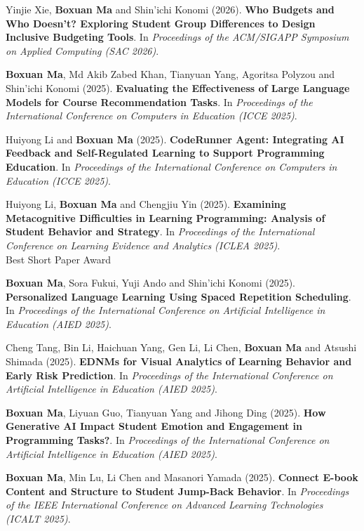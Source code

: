 \documentclass[a4paper,11pt]{article}
\begin{document}
\item[\textbf{[C.31]}] Yinjie Xie, \textbf{Boxuan Ma} and Shin'ichi Konomi (2026). \textbf{Who Budgets and Who Doesn't? Exploring Student Group Differences to Design Inclusive Budgeting Tools}. In \textit{Proceedings of the ACM/SIGAPP Symposium on Applied Computing (SAC 2026)}.
\item[\textbf{[C.30]}] \textbf{Boxuan Ma}, Md Akib Zabed Khan, Tianyuan Yang, Agoritsa Polyzou and Shin'ichi Konomi (2025). \textbf{Evaluating the Effectiveness of Large Language Models for Course Recommendation Tasks}. In \textit{Proceedings of the International Conference on Computers in Education (ICCE 2025)}.
\item[\textbf{[C.29]}] Huiyong Li and \textbf{Boxuan Ma} (2025). \textbf{CodeRunner Agent: Integrating AI Feedback and Self-Regulated Learning to Support Programming Education}. In \textit{Proceedings of the International Conference on Computers in Education (ICCE 2025)}.
\item[\textbf{[C.28]}] Huiyong Li, \textbf{Boxuan Ma} and Chengjiu Yin (2025). \textbf{Examining Metacognitive Difficulties in Learning Programming: Analysis of Student Behavior and Strategy}. In \textit{Proceedings of the International Conference on Learning Evidence and Analytics (ICLEA 2025)}. \\ \textcolor{red!80!black}{Best Short Paper Award}
\item[\textbf{[C.27]}] \textbf{Boxuan Ma}, Sora Fukui, Yuji Ando and Shin'ichi Konomi (2025). \textbf{Personalized Language Learning Using Spaced Repetition Scheduling}. In \textit{Proceedings of the International Conference on Artificial Intelligence in Education (AIED 2025)}.
\item[\textbf{[C.26]}] Cheng Tang, Bin Li, Haichuan Yang, Gen Li, Li Chen, \textbf{Boxuan Ma} and Atsushi Shimada (2025). \textbf{EDNMs for Visual Analytics of Learning Behavior and Early Risk Prediction}. In \textit{Proceedings of the International Conference on Artificial Intelligence in Education (AIED 2025)}.
\item[\textbf{[C.25]}] \textbf{Boxuan Ma}, Liyuan Guo, Tianyuan Yang and Jihong Ding (2025). \textbf{How Generative AI Impact Student Emotion and Engagement in Programming Tasks?}. In \textit{Proceedings of the International Conference on Artificial Intelligence in Education (AIED 2025)}.
\item[\textbf{[C.24]}] \textbf{Boxuan Ma}, Min Lu, Li Chen and Masanori Yamada (2025). \textbf{Connect E-book Content and Structure to Student Jump-Back Behavior}. In \textit{Proceedings of the IEEE International Conference on Advanced Learning Technologies (ICALT 2025)}.
\end{document}
